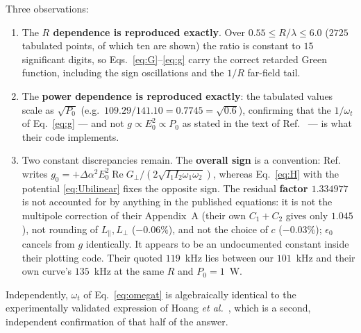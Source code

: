 \documentclass[11pt,a4paper]{article}
\newcommand{\dalpha}{\Delta\alpha}
\newcommand{\ReG}{\operatorname{Re}G_{\perp}}
\begin{document}
Three observations:
\begin{enumerate}\itemsep2pt
\item The \textbf{$R$ dependence is reproduced exactly}.  Over
$0.55\le R/\lambda\le6.0$ ($2725$ tabulated points, of which ten are shown) the
ratio is constant to $15$ significant digits, so
Eqs.~\eqref{eq:G}--\eqref{eq:g} carry the correct retarded Green function,
including the sign oscillations and the $1/R$ far-field tail.
\item The \textbf{power dependence is reproduced exactly}: the tabulated values
scale as $\sqrt{P_0}$ (e.g.\ $109.29/141.10=0.7745=\sqrt{0.6}$), confirming that
the $1/\omega_t$ of Eq.~\eqref{eq:g} --- and not $g\propto E_0^{2}\propto P_0$ as
stated in the text of Ref.~\cite{Zhang2025} --- is what their code implements.
\item Two constant discrepancies remain.  The \textbf{overall sign} is a
convention: Ref.~\cite{Zhang2025} writes $g_0=+\dalpha^{2}E_0^{2}\ReG/
(2\sqrt{I_1I_2\omega_1\omega_2})$, whereas Eq.~\eqref{eq:H} with the potential
\eqref{eq:Ubilinear} fixes the opposite sign.  The residual \textbf{factor
$1.334977$} is not accounted for by anything in the published equations: it is
not the multipole correction of their Appendix~A (their own $C_1+C_2$ gives only
$1.045$), not rounding of $L_{\parallel},L_{\perp}$ ($-0.06\%$), and not the
choice of $c$ ($-0.03\%$); $\epsilon_0$ cancels from $g$ identically.  It appears
to be an undocumented constant inside their plotting code.  Their quoted
$119$~kHz lies between our $101$~kHz and their own curve's $135$~kHz at the same
$R$ and $P_0=1$~W.
\end{enumerate}

Independently, $\omega_t$ of Eq.~\eqref{eq:omegat} is algebraically identical to
the experimentally validated expression of Hoang \emph{et al.}~\cite{Hoang2016},
which is a second, independent confirmation of that half of the answer.
\end{document}
